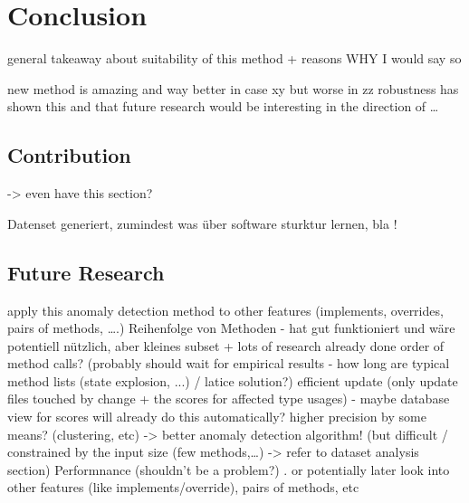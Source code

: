 \chapter{Conclusion}\label{ch:concl}
general takeaway about suitability of this method + reasons WHY I would say so

new method is amazing and way better in case xy but worse in zz
robustness has shown this and that
future research would be interesting in the direction of \ldots

\section{Contribution}
-> even have this section?

Datenset generiert, zumindest was über software sturktur lernen, bla !

\section{Future Research}
apply this anomaly detection method to other features (implements, overrides, pairs of methods, \ldots.)
Reihenfolge von Methoden - hat gut funktioniert und wäre potentiell nützlich, aber kleines subset + lots of research already done
order of method calls? (probably should wait for empirical results - how long are typical method lists (state explosion, ...) / latice solution?)
efficient update (only update files touched by change + the scores for affected type usages) - maybe database view for scores will already do this automatically? 
higher precision by some means? (clustering, etc)
-> better anomaly detection algorithm! (but difficult / constrained by the input size (few methods,\ldots) -> refer to dataset analysis section)
Performnance (shouldn't be a problem?)
.
or potentially later look into other features (like implements/override), pairs of methods, etc
